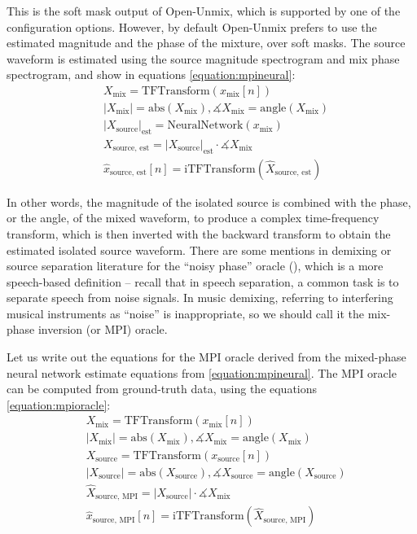 \documentclass[report.tex]{subfiles}
\begin{document}
This is the soft mask output of Open-Unmix, which is supported by one of the configuration options. However, by default Open-Unmix prefers to use the estimated magnitude and the phase of the mixture, over soft masks. The source waveform is estimated using the source magnitude spectrogram and mix phase spectrogram, and show in equations \eqref{equation:mpineural}:
\begin{align}\tag{3}\label{equation:mpineural}
	\nonumber & X_{\text{mix}} = \text{TFTransform}(x_{\text{mix}}[n])\\
	\nonumber & |X_{\text{mix}}| = \text{abs}(X_{\text{mix}}), \measuredangle{X_{\text{mix}}} = \text{angle}(X_{\text{mix}})\\
	\nonumber & {|X_{\text{source}}|}_{\text{est}} = \text{NeuralNetwork}(x_{\text{mix}})\\
	\nonumber & X_{\text{source, est}} = {|X_{\text{source}}|}_{\text{est}} \cdot \measuredangle{X_{\text{mix}}}\\
	\nonumber & \hat{x}_{\text{source, est}}[n] = \text{iTFTransform}(\hat{X}_{\text{source, est}})
\end{align}

In other words, the magnitude of the isolated source is combined with the phase, or the angle, of the mixed waveform, to produce a complex time-frequency transform, which is then inverted with the backward transform to obtain the estimated isolated source waveform. There are some mentions in demixing or source separation literature for the ``noisy phase'' oracle (\cite{noisyphase1, noisyphase2}), which is a more speech-based definition -- recall that in speech separation, a common task is to separate speech from noise signals. In music demixing, referring to interfering musical instruments as ``noise'' is inappropriate, so we should call it the mix-phase inversion (or MPI) oracle.

Let us write out the equations for the MPI oracle derived from the mixed-phase neural network estimate equations from \eqref{equation:mpineural}. The MPI oracle can be computed from ground-truth data, using the equations \eqref{equation:mpioracle}:
\begin{align}\tag{4}\label{equation:mpioracle}
	\nonumber & X_{\text{mix}} = \text{TFTransform}(x_{\text{mix}}[n])\\
	\nonumber & |X_{\text{mix}}| = \text{abs}(X_{\text{mix}}), \measuredangle{X_{\text{mix}}} = \text{angle}(X_{\text{mix}})\\
	\nonumber & X_{\text{source}} = \text{TFTransform}(x_{\text{source}}[n])\\
	\nonumber & |X_{\text{source}}| = \text{abs}(X_{\text{source}}), \measuredangle{X_{\text{source}}} = \text{angle}(X_{\text{source}})\\
	\nonumber & \hat{X}_{\text{source, MPI}} = |X_{\text{source}}| \cdot \measuredangle{X_{\text{mix}}}\\
	\nonumber & \hat{x}_{\text{source, MPI}}[n] = \text{iTFTransform}(\hat{X}_{\text{source, MPI}})
\end{align}
\end{document}
